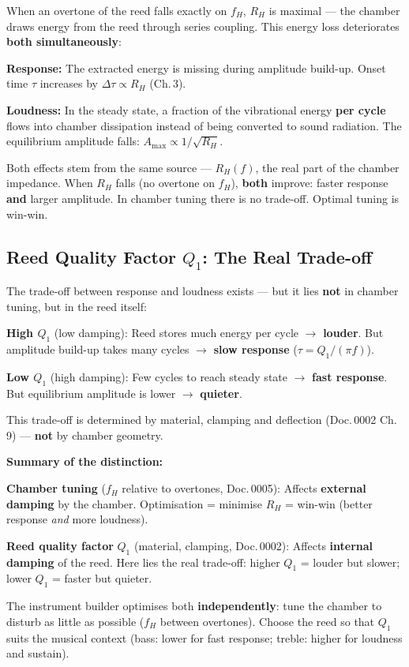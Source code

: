 \documentclass[11pt,a4paper]{article}
\begin{document}
When an overtone of the reed falls exactly on $f_H$, $R_H$ is maximal --- the chamber draws energy from the reed through series coupling. This energy loss deteriorates \textbf{both simultaneously}:

\textbf{Response:} The extracted energy is missing during amplitude build-up. Onset time $\tau$ increases by $\Delta\tau \propto R_H$ (Ch.\,3).

\textbf{Loudness:} In the steady state, a fraction of the vibrational energy \textbf{per cycle} flows into chamber dissipation instead of being converted to sound radiation. The equilibrium amplitude falls: $A_\text{max} \propto 1/\sqrt{R_H}$.

Both effects stem from the same source --- $R_H(f)$, the real part of the chamber impedance. When $R_H$ falls (no overtone on $f_H$), \textbf{both} improve: faster response \textbf{and} larger amplitude. In chamber tuning there is no trade-off. Optimal tuning is win-win.

\subsection{Reed Quality Factor $Q_1$: The Real Trade-off}

The trade-off between response and loudness exists --- but it lies \textbf{not} in chamber tuning, but in the reed itself:

\textbf{High $Q_1$} (low damping): Reed stores much energy per cycle $\to$ \textbf{louder}. But amplitude build-up takes many cycles $\to$ \textbf{slow response} ($\tau = Q_1/(\pi f)$).

\textbf{Low $Q_1$} (high damping): Few cycles to reach steady state $\to$ \textbf{fast response}. But equilibrium amplitude is lower $\to$ \textbf{quieter}.

This trade-off is determined by material, clamping and deflection (Doc.\,0002 Ch.\,9) --- \textbf{not} by chamber geometry.

\begin{keybox}
\textbf{Summary of the distinction:}

\textbf{Chamber tuning} ($f_H$ relative to overtones, Doc.\,0005): Affects \textbf{external damping} by the chamber. Optimisation = minimise $R_H$ = win-win (better response \textit{and} more loudness).

\textbf{Reed quality factor} $Q_1$ (material, clamping, Doc.\,0002): Affects \textbf{internal damping} of the reed. Here lies the real trade-off: higher $Q_1$ = louder but slower; lower $Q_1$ = faster but quieter.

The instrument builder optimises both \textbf{independently}: tune the chamber to disturb as little as possible ($f_H$ between overtones). Choose the reed so that $Q_1$ suits the musical context (bass: lower for fast response; treble: higher for loudness and sustain).
\end{keybox}
\end{document}
